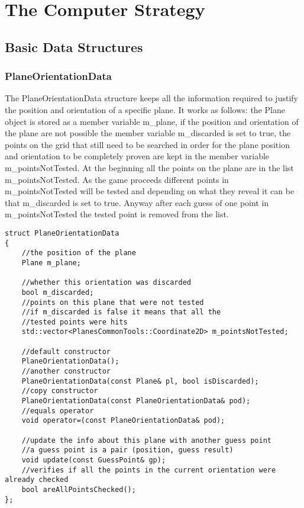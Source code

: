 \section{The Computer Strategy} \label {Computer_Strategy}

\subsection{Basic Data Structures} \label {Strategy_Data_Structures}

\subsubsection{PlaneOrientationData}

The PlaneOrientationData structure keeps all the information required to justify the position and orientation of a specific plane. It works as follows: the Plane object is stored as a member variable m\_plane, if the position and orientation of the plane are not possible the member variable m\_discarded is set to true, the points on the grid that still need to be searched in order for the plane position and orientation to be completely proven are kept in the member variable m\_pointsNotTested. At the beginning all the points on the plane are in the list m\_pointsNotTested. As the game proceeds different points in m\_pointsNotTested will be tested and depending on what they reveal it can be that m\_discarded is set to true. Anyway after each guess of one point in m\_pointsNotTested the tested point is removed from the list. 

\begin{lstlisting}
struct PlaneOrientationData
{
	//the position of the plane
	Plane m_plane;
	
	//whether this orientation was discarded
	bool m_discarded;
	//points on this plane that were not tested
	//if m_discarded is false it means that all the
	//tested points were hits
	std::vector<PlanesCommonTools::Coordinate2D> m_pointsNotTested;
	
	//default constructor
	PlaneOrientationData();
	//another constructor
	PlaneOrientationData(const Plane& pl, bool isDiscarded);
	//copy constructor
	PlaneOrientationData(const PlaneOrientationData& pod);
	//equals operator
	void operator=(const PlaneOrientationData& pod);
	
	//update the info about this plane with another guess point
	//a guess point is a pair (position, guess result)
	void update(const GuessPoint& gp);
	//verifies if all the points in the current orientation were already checked
	bool areAllPointsChecked();
};

\end{lstlisting}

